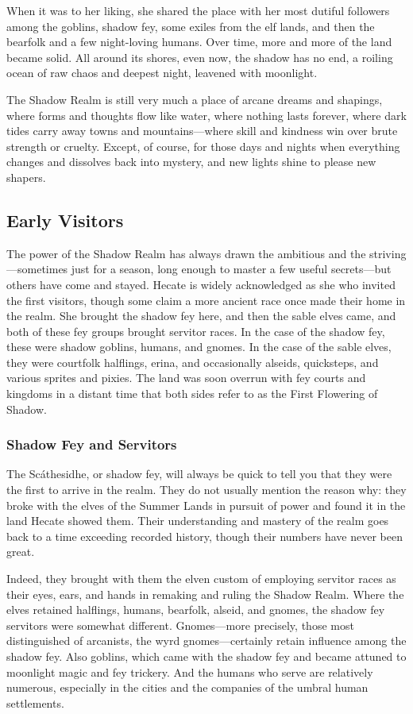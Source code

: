 \documentclass[10pt,a4paper,twoside,bg=print,twocolumn,openany,nodeprecatedcode]{dndbook}
\begin{document}
When it was to her liking, she shared the place with her most dutiful followers among the goblins, shadow fey, some exiles from the elf lands, and then the bearfolk and a few night-loving humans. Over time, more and more of the land became solid. All around its shores, even now, the shadow has no end, a roiling ocean of raw chaos and deepest night, leavened with moonlight.

The Shadow Realm is still very much a place of arcane dreams and shapings, where forms and thoughts flow like water, where nothing lasts forever, where dark tides carry away towns and mountains—where skill and kindness win over brute strength or cruelty. Except, of course, for those days and nights when everything changes and dissolves back into mystery, and new lights shine to please new shapers.

\subsection{Early Visitors}
The power of the Shadow Realm has always drawn the ambitious and the striving—sometimes just for a season, long enough to master a few useful secrets—but others have come and stayed. Hecate is widely acknowledged as she who invited the first visitors, though some claim a more ancient race once made their home in the realm. She brought the shadow fey here, and then the sable elves came, and both of these fey groups brought servitor races. In the case of the shadow fey, these were shadow goblins, humans, and gnomes. In the case of the sable elves, they were courtfolk halflings, erina, and occasionally alseids, quicksteps, and various sprites and pixies. The land was soon overrun with fey courts and kingdoms in a distant time that both sides refer to as the First Flowering of Shadow.

\subsubsection{Shadow Fey and Servitors}
The Scáthesidhe, or shadow fey, will always be quick to tell you that they were the first to arrive in the realm. They do not usually mention the reason why: they broke with the elves of the Summer Lands in pursuit of power and found it in the land Hecate showed them. Their understanding and mastery of the realm goes back to a time exceeding recorded history, though their numbers have never been great.

Indeed, they brought with them the elven custom of employing servitor races as their eyes, ears, and hands in remaking and ruling the Shadow Realm. Where the elves retained halflings, humans, bearfolk, alseid, and gnomes, the shadow fey servitors were somewhat different. Gnomes—more precisely, those most distinguished of arcanists, the wyrd gnomes—certainly retain influence among the shadow fey. Also goblins, which came with the shadow fey and became attuned to moonlight magic and fey trickery. And the humans who serve are relatively numerous, especially in the cities and the companies of the umbral human settlements.
\end{document}
